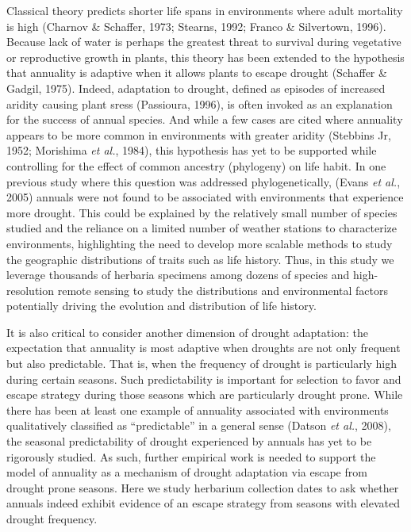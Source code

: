 \documentclass[man,floatsintext]{apa6}
\theoremstyle{definition}
\theoremstyle{definition}
\theoremstyle{definition}
\theoremstyle{remark}
\begin{document}
Classical theory predicts shorter life spans in environments where adult
mortality is high (Charnov \& Schaffer, 1973; Stearns, 1992; Franco \&
Silvertown, 1996). Because lack of water is perhaps the greatest threat
to survival during vegetative or reproductive growth in plants, this
theory has been extended to the hypothesis that annuality is adaptive
when it allows plants to escape drought (Schaffer \& Gadgil, 1975).
Indeed, adaptation to drought, defined as episodes of increased aridity
causing plant sress (Passioura, 1996), is often invoked as an
explanation for the success of annual species. And while a few cases are
cited where annuality appears to be more common in environments with
greater aridity (Stebbins Jr, 1952; Morishima \emph{et al.}, 1984), this
hypothesis has yet to be supported while controlling for the effect of
common ancestry (phylogeny) on life habit. In one previous study where
this question was addressed phylogenetically, (Evans \emph{et al.},
2005) annuals were not found to be associated with environments that
experience more drought. This could be explained by the relatively small
number of species studied and the reliance on a limited number of
weather stations to characterize environments, highlighting the need to
develop more scalable methods to study the geographic distributions of
traits such as life history. Thus, in this study we leverage thousands
of herbaria specimens among dozens of species and high-resolution remote
sensing to study the distributions and environmental factors potentially
driving the evolution and distribution of life history.

It is also critical to consider another dimension of drought adaptation:
the expectation that annuality is most adaptive when droughts are not
only frequent but also predictable. That is, when the frequency of
drought is particularly high during certain seasons. Such predictability
is important for selection to favor and escape strategy during those
seasons which are particularly drought prone. While there has been at
least one example of annuality associated with environments
qualitatively classified as \enquote{predictable} in a general sense
(Datson \emph{et al.}, 2008), the seasonal predictability of drought
experienced by annuals has yet to be rigorously studied. As such,
further empirical work is needed to support the model of annuality as a
mechanism of drought adaptation via escape from drought prone seasons.
Here we study herbarium collection dates to ask whether annuals indeed
exhibit evidence of an escape strategy from seasons with elevated
drought frequency.
\end{document}
